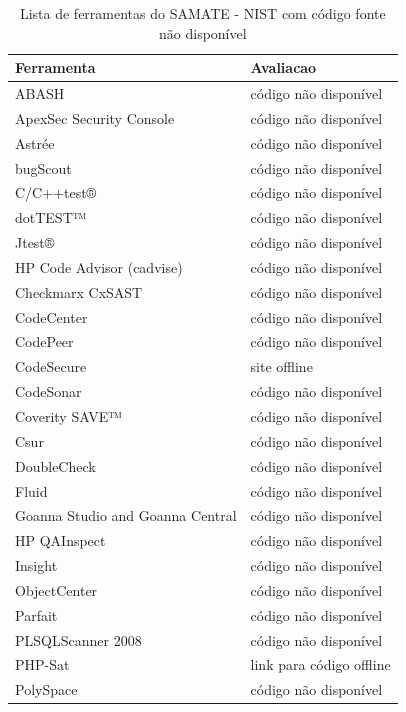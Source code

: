\documentclass[qual, classic, a4paper]{ufbathesis}
\begin{document}
\begin{table}
\caption{Lista de ferramentas do SAMATE - NIST com código fonte não disponível}
\centering
\begin{tabular}{| l | l |}
\hline
Ferramenta & Avaliacao  \\
\hline
ABASH                     & código não disponível \\
ApexSec Security Console  & código não disponível \\
Astrée                    & código não disponível \\
bugScout                  & código não disponível \\
C/C++test®                & código não disponível \\
dotTEST™                  & código não disponível \\
Jtest®                    & código não disponível \\
HP Code Advisor (cadvise) & código não disponível \\
Checkmarx CxSAST          & código não disponível \\
CodeCenter                & código não disponível \\
CodePeer                  & código não disponível \\
CodeSecure                & site offline \\
CodeSonar                 & código não disponível \\
Coverity SAVE™            & código não disponível \\
Csur                      & código não disponível \\
DoubleCheck               & código não disponível \\
Fluid                     & código não disponível \\
Goanna Studio and Goanna Central & código não disponível \\
HP QAInspect              & código não disponível \\
Insight                   & código não disponível \\
ObjectCenter              & código não disponível \\
Parfait                   & código não disponível \\
PLSQLScanner 2008         & código não disponível \\
PHP-Sat                   & link para código offline \\
PolySpace                 & código não disponível \\

\end{tabular}
\end{table}
\end{document}
